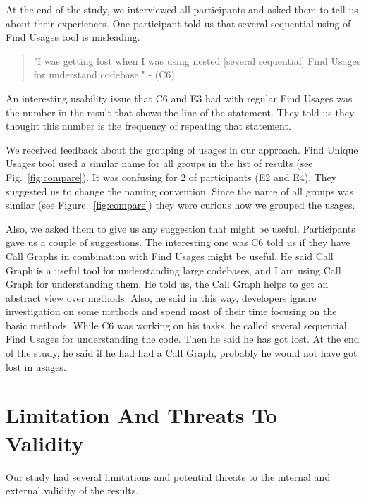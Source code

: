 \documentclass[conference]{IEEEtran}
\begin{document}
At the end of the study, we interviewed all participants and asked them to tell us about their experiences. One participant told us that several sequential using of Find Usages tool is misleading.
\begin{quote} "I was getting lost when I was using nested [several sequential] Find Usages for understand codebase." - (C6)\end{quote}

 An interesting usability issue that C6 and E3 had with regular Find Usages was the number in the result that shows the line of the statement. They told us they thought this number is the frequency of repeating that statement.\par
 
We received feedback about the grouping of usages in our approach. Find Unique Usages tool used a similar name for all groups in the list of results (see Fig.~\ref{fig:compare}). It was confusing for 2 of participants (E2 and E4). They suggested us to change the naming convention. Since the name of all groups was similar (see Figure.~\ref{fig:compare}) they were curious how we grouped the usages.\par

Also, we asked them to give us any suggestion that might be useful. Participants gave us a couple of suggestions. The interesting one was C6 told us if they have Call Graphs in combination with Find Usages might be useful. He said Call Graph is a useful tool for understanding large codebases, and I am using Call Graph for understanding them. He told us,  the Call Graph helps to get an abstract view over methods.  Also, he said in this way, developers ignore investigation on some methods and spend most of their time focusing on the basic methods. While C6 was working on his tasks, he called several sequential Find Usages for understanding the code. Then he said he has got lost. At the end of the study, he said if he had had a Call Graph, probably he would not have got lost in usages.     


\section{Limitation And Threats To Validity}
Our study had several limitations and potential threats to the internal and external validity of the results. \par  
\end{document}
